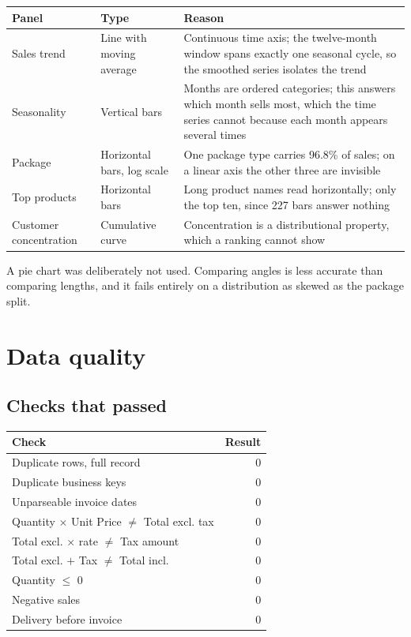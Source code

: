 \documentclass[11pt,a4paper]{article}
\begin{document}
\begin{table}[H]\centering\small
\begin{tabular}{@{}p{3.6cm}p{3.0cm}p{6.6cm}@{}}\toprule
\textbf{Panel} & \textbf{Type} & \textbf{Reason} \\ \midrule
Sales trend & Line with moving average & Continuous time axis; the twelve-month window spans exactly one seasonal cycle, so the smoothed series isolates the trend \\
Seasonality & Vertical bars & Months are ordered categories; this answers which month sells most, which the time series cannot because each month appears several times \\
Package & Horizontal bars, log scale & One package type carries 96.8\% of sales; on a linear axis the other three are invisible \\
Top products & Horizontal bars & Long product names read horizontally; only the top ten, since 227 bars answer nothing \\
Customer concentration & Cumulative curve & Concentration is a distributional property, which a ranking cannot show \\
\bottomrule\end{tabular}\end{table}

A pie chart was deliberately not used. Comparing angles is less accurate than comparing
lengths, and it fails entirely on a distribution as skewed as the package split.

\section{Data quality}

\subsection{Checks that passed}

\begin{table}[H]\centering\small
\begin{tabular}{@{}lr@{}}\toprule
\textbf{Check} & \textbf{Result} \\ \midrule
Duplicate rows, full record & 0 \\
Duplicate business keys & 0 \\
Unparseable invoice dates & 0 \\
Quantity $\times$ Unit Price $\neq$ Total excl. tax & 0 \\
Total excl. $\times$ rate $\neq$ Tax amount & 0 \\
Total excl. $+$ Tax $\neq$ Total incl. & 0 \\
Quantity $\leq$ 0 & 0 \\
Negative sales & 0 \\
Delivery before invoice & 0 \\
\bottomrule\end{tabular}\end{table}
\end{document}
